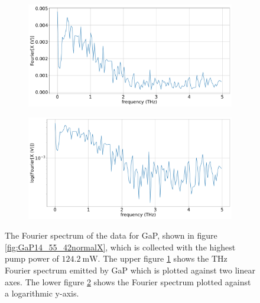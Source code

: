 \begin{figure}%
    \centering
    \begin{subfigure}{.6\textwidth}%
        \centering
        \includegraphics[width=\textwidth]{Plots/GaP14_55_42normalFX.pdf}%
        \label{fig:GaP14_55_42_fft}%
        \end{subfigure}%
    \hfill%
        \begin{subfigure}{.6\textwidth}%
        \centering
        \includegraphics[width=\textwidth]{Plots/GaP14_55_42normallog(FX).pdf}%
        \label{fig:GaP14_55_42_fft_log}%
    \end{subfigure}%
    \caption{The Fourier spectrum of the data for GaP, shown in figure \ref{fig:GaP14_55_42normalX}, which is collected with the highest pump power of $\SI{124.2}{\milli\W}$.
    The upper figure \ref{fig:GaP14_55_42_fft} shows the $\si{\tera\hertz}$ Fourier spectrum emitted by GaP which is plotted against two linear axes.
    The lower figure \ref{fig:GaP14_55_42_fft_log} shows the Fourier spectrum plotted against a logarithmic y-axis.}%
    \label{fig:fourier_gap}%
\end{figure}%
\FloatBarrier
